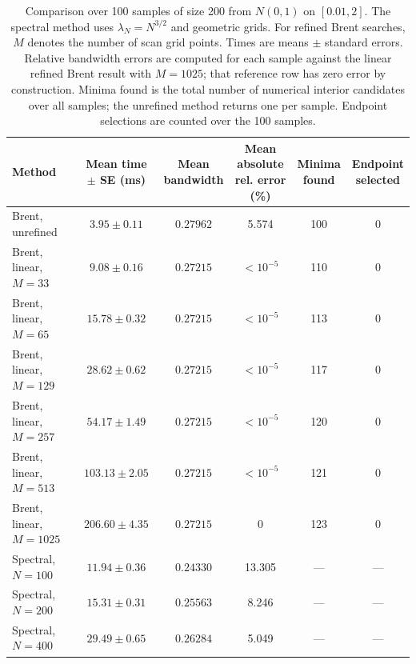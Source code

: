 \begin{table}[htbp]
    \centering
    \footnotesize
    \setlength{\tabcolsep}{3pt}
    \begin{tabular}{lccccc}
        \toprule
        Method & \shortstack{Mean time\\$\pm$ SE (ms)} & \shortstack{Mean\\bandwidth} & \shortstack{Mean absolute\\rel. error (\%)} & \shortstack{Minima\\found} & \shortstack{Endpoint\\selected} \\
        \midrule
        Brent, unrefined & $3.95 \pm 0.11$ & $0.27962$ & 5.574 & 100 & 0 \\
        \midrule
        Brent, linear, $M=33$ & $9.08 \pm 0.16$ & $0.27215$ & $<10^{-5}$ & 110 & 0 \\
        Brent, linear, $M=65$ & $15.78 \pm 0.32$ & $0.27215$ & $<10^{-5}$ & 113 & 0 \\
        Brent, linear, $M=129$ & $28.62 \pm 0.62$ & $0.27215$ & $<10^{-5}$ & 117 & 0 \\
        Brent, linear, $M=257$ & $54.17 \pm 1.49$ & $0.27215$ & $<10^{-5}$ & 120 & 0 \\
        Brent, linear, $M=513$ & $103.13 \pm 2.05$ & $0.27215$ & $<10^{-5}$ & 121 & 0 \\
        Brent, linear, $M=1025$ & $206.60 \pm 4.35$ & $0.27215$ & 0 & 123 & 0 \\
        \midrule
        Spectral, $N=100$ & $11.94 \pm 0.36$ & $0.24330$ & 13.305 & --- & --- \\
        Spectral, $N=200$ & $15.31 \pm 0.31$ & $0.25563$ & 8.246 & --- & --- \\
        Spectral, $N=400$ & $29.49 \pm 0.65$ & $0.26284$ & 5.049 & --- & --- \\
        \bottomrule
    \end{tabular}
    \caption{Comparison over 100 samples of size 200 from $N(0,1)$ on $[0.01,2]$. The spectral method uses $\lambda_N=N^{3/2}$ and geometric grids. For refined Brent searches, $M$ denotes the number of scan grid points. Times are means $\pm$ standard errors. Relative bandwidth errors are computed for each sample against the linear refined Brent result with $M=1025$; that reference row has zero error by construction. Minima found is the total number of numerical interior candidates over all samples; the unrefined method returns one per sample. Endpoint selections are counted over the 100 samples.}
\end{table}
